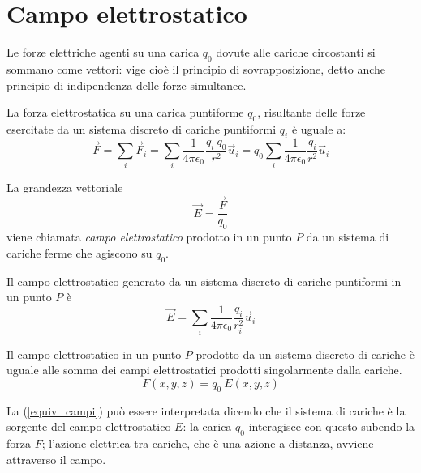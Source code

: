 \documentclass[class=book, crop=false, oneside, 12pt]{standalone}
\begin{document}
\section{Campo elettrostatico}

Le forze elettriche agenti su una carica \(q_0\) dovute alle cariche circostanti si sommano come vettori: vige cioè il principio di sovrapposizione, detto anche principio di indipendenza delle forze simultanee.

La forza elettrostatica su una carica puntiforme \(q_0\), risultante delle forze esercitate da un sistema discreto di cariche puntiformi \(q_i\) è uguale a: 
\begin{equation}
    \overrightarrow{F} = \sum_i \overrightarrow{F}_i = \sum_i \frac{1}{4 \pi \epsilon_0} \frac{q_i \ q_0}{r^2} \overrightarrow{u}_i = q_0 \sum_i \frac{1}{4 \pi \epsilon_0} \frac{q_i}{r^2} \overrightarrow{u}_i  
\end{equation}

La grandezza vettoriale
\begin{equation}
    \overrightarrow{E} = \frac{\overrightarrow{F}}{q_0}
\end{equation}
viene chiamata \emph{campo elettrostatico} prodotto in un punto \(P\) da un sistema di cariche ferme che agiscono su \(q_0\).

Il campo elettrostatico generato da un sistema discreto di cariche puntiformi in un punto \(P\) è
\begin{equation}
    \overrightarrow{E} =\sum_i \frac{1}{4 \pi \epsilon_0} \frac{q_i}{r_i^2} \overrightarrow{u}_i
\end{equation}

Il campo elettrostatico in un punto \(P\) prodotto da un sistema discreto di cariche è uguale alle somma dei campi elettrostatici prodotti singolarmente dalla cariche.
\begin{equation} \label{equiv_campi}
    F ( x, y, z) = q_0 \ E ( x, y, z) 
\end{equation}

La (\ref{equiv_campi}) può essere interpretata dicendo che il sistema di cariche è la sorgente del campo elettrostatico \(E\): la carica \(q_0\) interagisce con questo subendo la forza \(F\); 
l'azione elettrica tra cariche, che è una azione a distanza, avviene attraverso il campo. 
\end{document}
